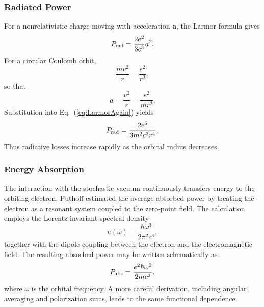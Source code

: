 \subsubsection{Radiated Power}
For a nonrelativistic charge moving with acceleration
$\mathbf a$, the Larmor formula gives
\begin{equation}
P_{\rm rad}=\frac{2e^2}{3c^3}a^2.
\label{eq:LarmorAgain}
\end{equation}
For a circular Coulomb orbit,
\begin{equation}
\frac{mv^2}{r}=\frac{e^2}{r^2},
\end{equation}
so that
\begin{equation}
a=\frac{v^2}{r}=\frac{e^2}{mr^2}.
\end{equation}
Substitution into Eq.~(\ref{eq:LarmorAgain}) yields
\begin{equation}
P_{\rm rad}=\frac{2e^6}{3m^2c^3r^4}.
\label{eq:PRadCircular}
\end{equation}
Thus radiative losses increase rapidly as the orbital radius decreases.
\subsubsection{Energy Absorption}
The interaction with the stochastic vacuum continuously transfers energy
to the orbiting electron.
Puthoff estimated the average absorbed power by treating the electron as
a resonant system coupled to the zero-point field. The calculation
employs the Lorentz-invariant spectral density
\begin{equation}
u(\omega)=\frac{\hbar\omega^3}{2\pi^2c^3},
\end{equation}
together with the dipole coupling between the electron and the
electromagnetic field.
The resulting absorbed power may be written schematically as
\begin{equation}
P_{\rm abs}=\frac{e^2\hbar\omega^3}{2mc^3},
\label{eq:PAbs}
\end{equation}
where $\omega$ is the orbital frequency. A more careful derivation,
including angular averaging and polarization sums, leads to the same
functional dependence.
